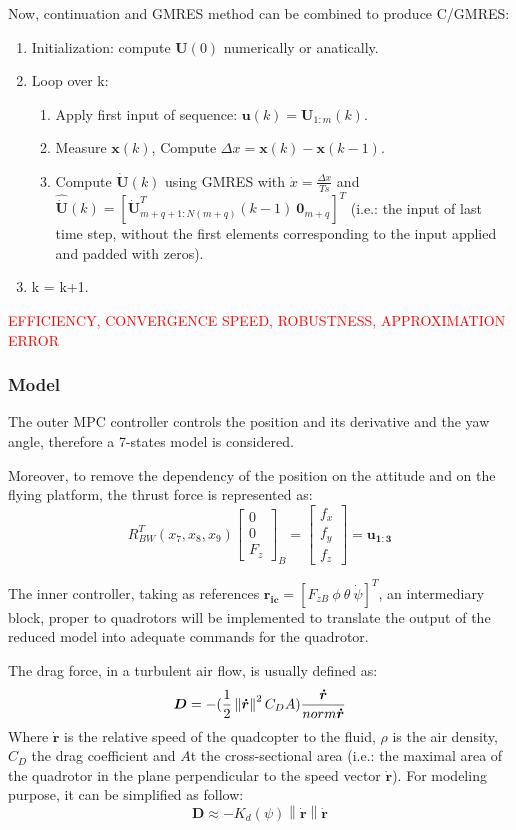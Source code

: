 \documentclass[a4paper, 12pt]{report}
\newcommand\norm[1]{\left\lVert#1\right\rVert}
\begin{document}
Now, continuation and GMRES method can be combined to produce C/GMRES:
\begin{enumerate}
\item Initialization: compute $\boldsymbol{U}(0)$ numerically or anatically.
\item Loop over k:
\begin{enumerate}
\item Apply first input of sequence: $\boldsymbol{u}(k) = \boldsymbol{U}_{1:m}(k)$.
\item Measure $\boldsymbol{x}(k)$, Compute $\Delta x = \boldsymbol{x}(k) - \boldsymbol{x}(k-1)$.
\item Compute $\boldsymbol{\dot U}(k)$ using GMRES with $\dot x = \frac{\Delta x}{Ts}$ and $\boldsymbol{\hat{\dot U}}(k) = [\boldsymbol{\dot U}^T_{m+q+1:N(m+q)}(k-1)\ \boldsymbol{0}_{m+q}]^T $ (i.e.: the input of last time step, without the first elements corresponding to the input applied and padded with zeros).
\end{enumerate}
\item k = k+1.
\end{enumerate}

\textcolor{red}{EFFICIENCY, CONVERGENCE SPEED, ROBUSTNESS, APPROXIMATION ERROR}


\subsubsection{Model}
The outer MPC controller controls the position and its derivative and the yaw angle, therefore a 7-states model is considered. 

Moreover, to remove the dependency of the position on the attitude and on the flying platform, the thrust force is represented as:
\[ R_{BW}^T(x_7, x_8, x_9) \begin{bmatrix}  0\\ 0\\ F_z \end{bmatrix}_B = \begin{bmatrix}  f_x\\ f_y\\ f_z \end{bmatrix} = \boldsymbol{u_{1:3}}\]

The inner controller, taking as references $\boldsymbol{r_{ic}} = [F_{zB} \ \phi \  \theta \ \dot \psi]^T$, an intermediary block, proper to quadrotors will be implemented to translate the output of the reduced model into adequate commands for the quadrotor.

The drag force, in a turbulent air flow, is usually defined as:
\[ \boldsymbol{D} = -(\frac{1}{2} \norm{\boldsymbol{\dot r}}^2 C_D A) \frac{\boldsymbol{\dot r}}{\\norm{\boldsymbol{\dot r}}}\]
Where $\boldsymbol{\dot r}$ is the relative speed of the quadcopter to the fluid, $\rho$ is the air density, $C_D$  the drag coefficient and $A$t the cross-sectional area (i.e.: the maximal area of the quadrotor in the plane perpendicular to the speed vector $\boldsymbol{\dot r}$). For modeling purpose, it can be simplified as follow:
\[ \boldsymbol{D} \approx -K_d(\psi) \norm{\boldsymbol{\dot r}} \boldsymbol{\dot r}\]
\end{document}
